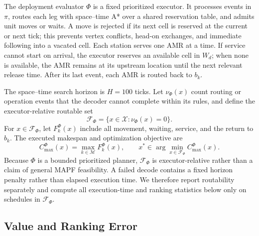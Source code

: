 The deployment evaluator $\Phi$ is a fixed prioritized executor. It processes
events in $\pi$, routes each leg with space--time A* over a shared reservation
table, and admits unit moves or waits. A move is rejected if its next cell is
reserved at the current or next tick; this prevents vertex conflicts,
head-on exchanges, and immediate following into a vacated cell. Each station
serves one AMR at a time. If service cannot start on arrival, the executor
reserves an available cell in $W_d$; when none is available, the AMR remains
at its upstream location until the next relevant release time. After its
last event, each AMR is routed back to $b_k$.

The space--time search horizon is $H=100$ ticks. Let $\nu_\Phi(x)$ count
routing or operation events that the decoder cannot complete within its
rules, and define the executor-relative routable set
\begin{equation}
 \mathcal F_\Phi=\{x\in\mathcal X:\nu_\Phi(x)=0\}.
 \label{eq:routable-set}
\end{equation}
For $x\in\mathcal F_\Phi$, let $F_k^\Phi(x)$ include all movement, waiting,
service, and the return to $b_k$. The executed makespan and optimization
objective are
\begin{equation}
 C_{\max}^{\Phi}(x)=\max_{k\in\mathcal M}F_k^\Phi(x),
 \qquad
 x^*\in\arg\min_{x\in\mathcal F_\Phi}C_{\max}^{\Phi}(x).
 \label{eq:objective}
\end{equation}
Because $\Phi$ is a bounded prioritized planner, $\mathcal F_\Phi$ is
executor-relative rather than a claim of general MAPF feasibility. A failed
decode contains a fixed horizon penalty rather than elapsed execution time.
We therefore report routability separately and compute all execution-time and
ranking statistics below only on schedules in $\mathcal F_\Phi$.

\subsection{Value and Ranking Error}
\label{sec:penalty}

